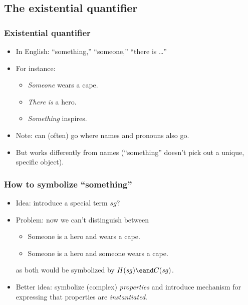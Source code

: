 \newhourlecture

\subsection{The existential quantifier}

\begin{frame}
\frametitle{Existential quantifier}

\begin{itemize}[<+->]
  \item In English: ``something,'' ``someone,'' ``there is \dots''
  \item For instance:
  \begin{itemize}[<+->]
    \item \emph{Someone} wears a cape.
    \item \emph{There is} a hero.
    \item \emph{Something} inspires.
  \end{itemize}
  \item Note: can (often) go where names and pronouns also go.
  \item But works differently from names (``something'' doesn't pick
  out a unique, specific object).
\end{itemize}
\end{frame}

\begin{frame}
  \frametitle{How to symbolize ``something''}

  \begin{itemize}[<+->]
    \item Idea: introduce a special term $\mathit{sg}$?
    \item Problem: now we can't distinguish between
    \begin{itemize}[<+->]
      \item Someone is a hero and wears a cape.
      \item Someone is a hero and someone wears a cape.
    \end{itemize}
    as both would be symbolized by $H(\mathit{sg}) \eand
    C(\mathit{sg})$.
    \item Better idea: symbolize (complex) \emph{properties} and introduce
    mechanism for expressing that properties are \emph{instantiated}.
  \end{itemize}
\end{frame}

